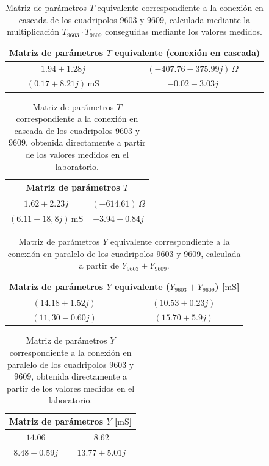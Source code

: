 \begin{table}[H]
\centering
\begin{tabular}{|c|c|}
\hline
\multicolumn{2}{|c|}{\textbf{Matriz de parámetros $T$ equivalente (conexión en cascada)}} \\ \hline
$1.94 + 1.28j$ & $(-407.76 - 375.99j)\,\Omega$ \\ \hline
$(0.17 + 8.21j)\,\mathrm{mS}$ & $-0.02 - 3.03j$ \\ \hline
\end{tabular}
\caption{Matriz de parámetros $T$ equivalente correspondiente a la conexión en cascada de los cuadripolos 9603 y 9609, calculada mediante la multiplicación $T_{9603} \cdot T_{9609}$ conseguidas mediante los valores medidos.}
\label{tab:matriz_T_cascada_procuto}
\end{table}

\begin{table}[H]
\centering
\begin{tabular}{|c|c|}
\hline
\multicolumn{2}{|c|}{\textbf{Matriz de parámetros $T$ }} \\ \hline
$1.62 + 2.23j$ & $(-614.61)\,\Omega$ \\ \hline
$(6.11 + 18,8j)\,\mathrm{mS}$ & $-3.94 - 0.84j$ \\ \hline
\end{tabular}
\caption{Matriz de parámetros $T$ correspondiente a la conexión en cascada de los cuadripolos 9603 y 9609, obtenida directamente a partir de los valores medidos en el laboratorio.}
\label{tab:matriz_T_cascada_directa}
\end{table}

\begin{table}[H]
\centering
\begin{tabular}{|c|c|}
\hline
\multicolumn{2}{|c|}{\textbf{Matriz de parámetros $Y$ equivalente ($Y_{9603} + Y_{9609}$) [$\mathrm{mS}$] }} \\ \hline
$(14.18 + 1.52j)\,$ & $(10.53 + 0.23j)\,$ \\ \hline
$(11,30 - 0.60j)\,$ & $(15.70 + 5.9j)\,$ \\ \hline
\end{tabular}
\caption{Matriz de parámetros $Y$ equivalente correspondiente a la conexión en paralelo de los cuadripolos 9603 y 9609, calculada a partir de $Y_{9603} + Y_{9609}$.}
\label{tab:matriz_Y_paralelo_suma}
\end{table}

\begin{table}[H]
\centering
\begin{tabular}{|c|c|}
\hline
\multicolumn{2}{|c|}{\textbf{Matriz de parámetros $Y$  [$\mathrm{mS}$]}} \\ \hline
$14.06\, $ & $8.62\, $ \\ \hline
$8.48 - 0.59j\, $ & $13.77 + 5.01 j\,$ \\ \hline
\end{tabular}
\caption{Matriz de parámetros $Y$ correspondiente a la conexión en paralelo de los cuadripolos 9603 y 9609, obtenida directamente a partir de los valores medidos en el laboratorio.}
\label{tab:matriz_Y_paralelo_directa}
\end{table}

